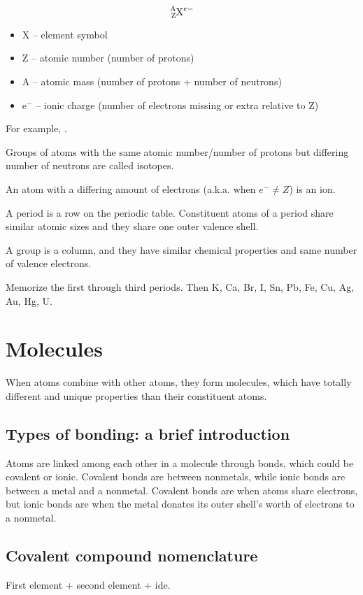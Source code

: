 \documentclass[letterpaper, 12pt]{article}
\begin{document}
$$\ce{^{A}_{Z}X^{e-}}$$

\begin{itemize}
	\item X -- element symbol
	\item Z -- atomic number (number of protons)
	\item A -- atomic mass (number of protons + number of neutrons)
	\item e$^{-}$ -- ionic charge (number of electrons missing or extra relative to Z)
\end{itemize}

For example, .

Groups of atoms with the same atomic number/number of protons but differing number of neutrons are called isotopes.

An atom with a differing amount of electrons (a.k.a. when $e^{-} \neq Z$) is an ion.

A period is a row on the periodic table. Constituent atoms of a period share similar atomic sizes and they share one outer valence shell.

A group is a column, and they have similar chemical properties and same number of valence electrons.

Memorize the first through third periods. Then K, Ca, Br, I, Sn, Pb, Fe, Cu, Ag, Au, Hg, U.

\section{Molecules}
When atoms combine with other atoms, they form molecules, which have totally different and unique properties than their constituent atoms.

	\subsection{Types of bonding: a brief introduction}
	Atoms are linked among each other in a molecule through bonds, which could be covalent or ionic. Covalent bonds are between nonmetals, while ionic bonds are between a metal and a nonmetal. Covalent bonds are when atoms share electrons, but ionic bonds are when the metal donates its outer shell's worth of electrons to a nonmetal.

	\subsection{Covalent compound nomenclature}
	First element + second element + ide.
\end{document}
